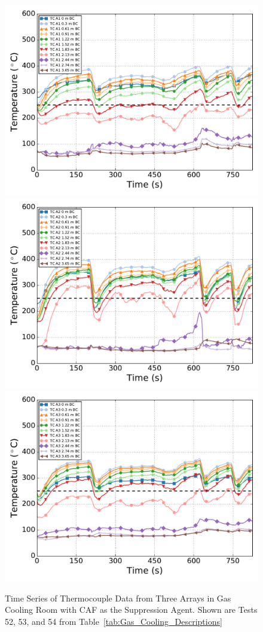\documentclass[12pt,oneside]{book}
\begin{document}
\begin{figure}[ht!]
	\includegraphics[width=.5\columnwidth]{../Figures/Gas_Cooling/GCSeries52_TC_A1}
	\includegraphics[width=.5\columnwidth]{../Figures/Gas_Cooling/GCSeries52_TC_A2}
	\includegraphics[width=.5\columnwidth]{../Figures/Gas_Cooling/GCSeries52_TC_A3}
	\caption{Time Series of Thermocouple Data from Three Arrays in Gas Cooling Room with CAF as the Suppression Agent. Shown are Tests 52, 53, and 54 from Table~\ref{tab:Gas_Cooling_Descriptions}}
	\label{fig:gas_cooling_sub5}
\end{figure}

\clearpage
\end{document}
